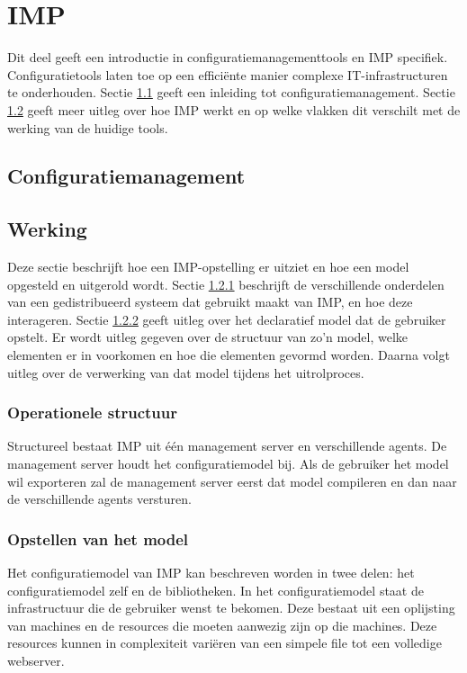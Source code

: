 
\chapter{IMP}
\label{sec:IMP}
Dit deel geeft een introductie in configuratiemanagementtools en IMP specifiek.
Configuratietools laten toe op een effici\"ente manier complexe IT-infrastructuren te onderhouden.
Sectie \ref{sec:configuratiemanagement} geeft een inleiding tot configuratiemanagement.
Sectie \ref{sec:IMP_werking} geeft meer uitleg over hoe IMP werkt en op welke vlakken dit verschilt met de werking van de huidige tools.

\section{Configuratiemanagement}
\label{sec:configuratiemanagement}

\section{Werking}
\label{sec:IMP_werking}
Deze sectie beschrijft hoe een IMP-opstelling er uitziet en hoe een model opgesteld en uitgerold wordt.
Sectie \ref{sec:IMP_structuur} beschrijft de verschillende onderdelen van een gedistribueerd systeem dat gebruikt maakt van IMP, en hoe deze interageren.
Sectie \ref{sec:IMP_opstellen_model} geeft uitleg over het declaratief model dat de gebruiker opstelt.
Er wordt uitleg gegeven over de structuur van zo'n model, welke elementen er in voorkomen en hoe die elementen gevormd worden.
Daarna volgt uitleg over de verwerking van dat model tijdens het uitrolproces.

\subsection{Operationele structuur}
\label{sec:IMP_structuur}
Structureel bestaat IMP uit \'e\'en management server en verschillende agents.
De management server houdt het configuratiemodel bij.
Als de gebruiker het model wil exporteren zal de management server eerst dat model compileren en dan naar de verschillende agents versturen.

\subsection{Opstellen van het model}
\label{sec:IMP_opstellen_model}
Het configuratiemodel van IMP kan beschreven worden in twee delen: het configuratiemodel zelf en de bibliotheken.
In het configuratiemodel staat de infrastructuur die de gebruiker wenst te bekomen.
Deze bestaat uit een oplijsting van machines en de resources die moeten aanwezig zijn op die machines.
Deze resources kunnen in complexiteit vari\"eren van een simpele file tot een volledige webserver.

